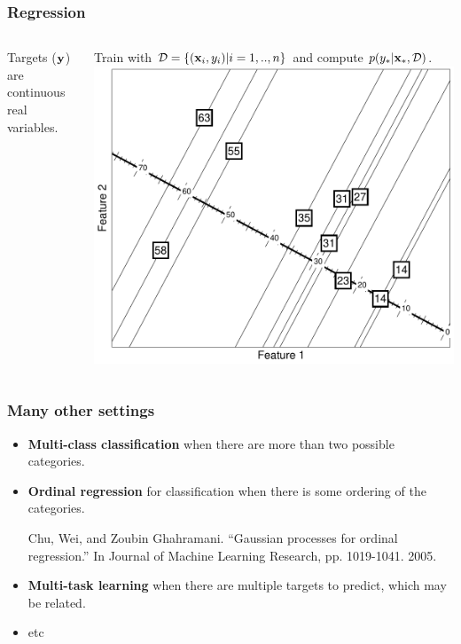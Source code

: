 \begin{frame}
\frametitle{Regression}
\begin{columns}
Targets (${\bf y}$) are continuous real variables.\par
Train with $\mathcal{D} = \{({\bf x}_i,y_i) | i=1,..,n\}$ and compute $p(y_* | {\bf x}_*, \mathcal{D})$.
\includegraphics[width=\textwidth]{regression}
\end{columns}
\end{frame}

\begin{frame}
\frametitle{Many other settings}
\begin{itemize}
\item {\bf Multi-class classification} when there are more than two possible categories.
\item {\bf Ordinal regression} for classification when there is some ordering of the categories.\par
\begin{tiny}
Chu, Wei, and Zoubin Ghahramani. ``Gaussian processes for ordinal regression.'' In Journal of Machine Learning Research, pp. 1019-1041. 2005.\par
\end{tiny}
\item {\bf Multi-task learning} when there are multiple targets to predict, which may be related.
\item etc
\end{itemize}
\end{frame}
